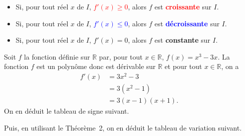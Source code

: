 \documentclass[11pt]{article}
\begin{document}
\begin{thmadm}
   \begin{itemize}
    \item Si, pour tout réel $x$ de $I$, \textcolor{red}{$f'(x)\geq 0$}, alors
      $f$ est \textbf{\textcolor{red}{croissante}} sur $I$.
    \item Si, pour tout réel $x$ de $I$, \textcolor{blue}{$f'(x)\leq 0$}, alors
      $f$ est \textbf{\textcolor{blue}{d\'ecroissante}} sur $I$.
    \item Si, pour tout réel $x$ de $I$, \textcolor{green!50!black}{$f'(x)= 0$}, alors
      $f$ est \textbf{\textcolor{green!50!black}{constante}} sur $I$.
  \end{itemize}
\end{thmadm}
\begin{exemple}
  Soit $f$ la fonction définie sur $\mathbb{R}$ par, pour tout $x\in\mathbb{R}$,
  $f(x)=x^3-3x$. La fonction $f$ est un polynôme donc est dérivable sur
  $\mathbb{R}$ et pour tout $x\in\mathbb{R}$, on a
  \begin{align*}
    f'(x) &= 3x^2-3 \\
    &= 3(x^2-1) \\
    &= 3(x-1)(x+1).
  \end{align*}
  On en déduit le tableau de signe suivant.\\
\begin{minipage}{.6\textwidth}
  \begin{center}
  \end{center}
  Puis, en utilisant le Théorème~2, on en déduit le tableau de variation
  suivant.
  \begin{center}
  \end{center}
\end{minipage}
\begin{minipage}{.4\textwidth}
  \begin{center}
  \end{center}
\end{minipage}
\end{exemple}
\end{document}
